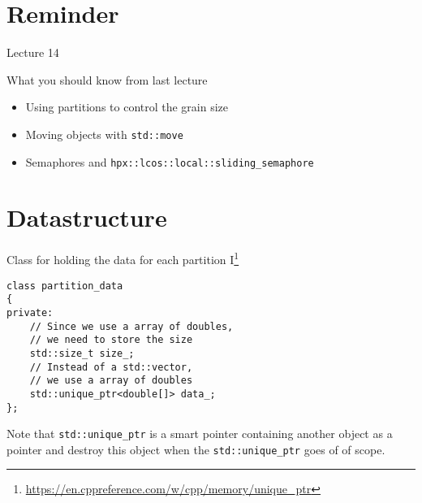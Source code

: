 \documentclass[12pt,t]{beamer}
\title{\coursename}
\subtitle{Lecture 15: Parallel partition-based 1D heat equation }
\date {
 \tiny \url{\courseurl}
\vspace{2cm}
\doclicenseThis  
  
}
\begin{document}
 {
    \frame {
        \titlepage
    }
}

\frame{

\tableofcontents

}


\section{Reminder}
\begin{frame}{Lecture 14}
\begin{block}{What you should know from last lecture}
\begin{itemize}
\item Using partitions to control the grain size
\item Moving objects with \lstinline|std::move|
\item Semaphores and \lstinline|hpx::lcos::local::sliding_semaphore|
\end{itemize}
\end{block}
\end{frame}

\section{Datastructure}

\begin{frame}[fragile]{Class for holding the data for each partition I\footnote{\tiny\url{https://en.cppreference.com/w/cpp/memory/unique_ptr}}}

\begin{lstlisting}
class partition_data
{
private:
    // Since we use a array of doubles, 
    // we need to store the size 
    std::size_t size_;
    // Instead of a std::vector, 
    // we use a array of doubles 
    std::unique_ptr<double[]> data_;
};
\end{lstlisting}

Note that \lstinline|std::unique_ptr| is a smart pointer containing another object as a pointer and destroy this object when the \lstinline|std::unique_ptr| goes of of scope.

\end{frame}
\end{document}
